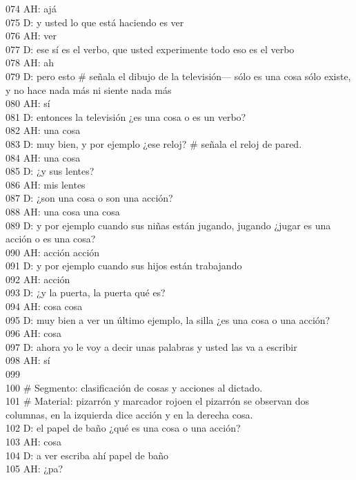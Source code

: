 074 AH: ajá\\
075 D: y usted lo que está haciendo es ver\\
076 AH: ver\\
077 D: ese sí es el verbo, que usted experimente todo eso es el verbo\\
078 AH: ah\\
079 D: pero esto \# señala el dibujo de la televisión--- sólo es una cosa sólo existe, y no hace nada más ni siente nada más\\
080 AH: sí\\
081 D: entonces la televisión ¿es una cosa o es un verbo?\\
082 AH: una cosa\\
083 D: muy bien, y por ejemplo ¿ese reloj? \# señala el reloj de pared.\\
084 AH: una cosa\\
085 D: ¿y sus lentes?\\
086 AH: mis lentes\\
087 D: ¿son una cosa o son una acción?\\
088 AH: una cosa una cosa\\
089 D: y por ejemplo cuando sus niñas están jugando, jugando ¿jugar es una acción o es una cosa?\\
090 AH: acción acción\\
091 D: y por ejemplo cuando sus hijos están trabajando\\
092 AH: acción\\
093 D: ¿y la puerta, la puerta qué es?\\
094 AH: cosa cosa\\
095 D: muy bien a ver un último ejemplo, la silla ¿es una cosa o una acción?\\
096 AH: cosa\\
097 D: ahora yo le voy a decir unas palabras y usted las va a escribir\\
098 AH: sí\\
099 \\
100 \# Segmento: clasificación de cosas y acciones al dictado.\\
101 \# Material: pizarrón y marcador rojoen el pizarrón se observan dos columnas, en la izquierda dice acción y en la derecha cosa.\\
102 D: el papel de baño ¿qué es una cosa o una acción?\\
103 AH: cosa\\
104 D: a ver escriba ahí papel de baño\\
105 AH: ¿pa?\\
